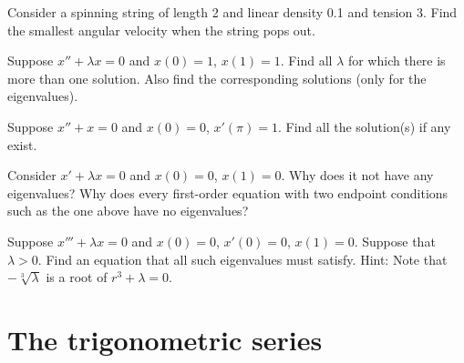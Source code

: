\setcounter{exercise}{100}

\begin{exercise}
Consider a spinning string of length 2 and linear density 0.1 and tension 3.
Find the smallest angular velocity when the string pops out.
\end{exercise}

\begin{exercise}
Suppose $x'' + \lambda x = 0$ and $x(0)=1$, $x(1) = 1$.
Find all $\lambda$ for which there is more
than one solution.  Also find the corresponding solutions (only for the
eigenvalues).
\end{exercise}

\begin{exercise}
Suppose $x'' + x = 0$ and $x(0)=0$, $x'(\pi) = 1$.
Find all the solution(s) if any exist.
\end{exercise}

\begin{exercise}
Consider
$x' + \lambda x = 0$ and $x(0)=0$, $x(1) = 0$.  Why does it not
have any eigenvalues?  Why does every first-order equation with two endpoint
conditions such as the one above have no eigenvalues?
\end{exercise}

\begin{exercise}[challenging]
Suppose $x''' + \lambda x = 0$ and $x(0)=0$, $x'(0) = 0$, $x(1) = 0$.
Suppose that $\lambda > 0$.  Find an equation that all such
eigenvalues must satisfy.
Hint: Note that $-\sqrt[3]{\lambda}$ is a root
of $r^3+\lambda = 0$.
\end{exercise}


\sectionnewpage
\section{The trigonometric series} \label{ts:section}

